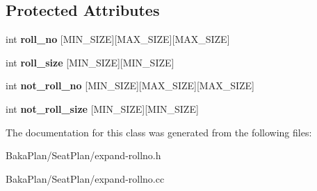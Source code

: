 \subsection*{Protected Attributes}
\begin{DoxyCompactItemize}
\item 
\hypertarget{classExapandRollNo_ae27a8647cfc7f93a5ba2fbfef8afa5c8}{int {\bfseries roll\-\_\-no} \mbox{[}M\-I\-N\-\_\-\-S\-I\-Z\-E\mbox{]}\mbox{[}M\-A\-X\-\_\-\-S\-I\-Z\-E\mbox{]}\mbox{[}M\-A\-X\-\_\-\-S\-I\-Z\-E\mbox{]}}\label{classExapandRollNo_ae27a8647cfc7f93a5ba2fbfef8afa5c8}

\item 
\hypertarget{classExapandRollNo_a892479a25a021a95e9c4b38ed30208a5}{int {\bfseries roll\-\_\-size} \mbox{[}M\-I\-N\-\_\-\-S\-I\-Z\-E\mbox{]}\mbox{[}M\-I\-N\-\_\-\-S\-I\-Z\-E\mbox{]}}\label{classExapandRollNo_a892479a25a021a95e9c4b38ed30208a5}

\item 
\hypertarget{classExapandRollNo_ac3526c93e25b52ab118f66150c980dbd}{int {\bfseries not\-\_\-roll\-\_\-no} \mbox{[}M\-I\-N\-\_\-\-S\-I\-Z\-E\mbox{]}\mbox{[}M\-A\-X\-\_\-\-S\-I\-Z\-E\mbox{]}\mbox{[}M\-A\-X\-\_\-\-S\-I\-Z\-E\mbox{]}}\label{classExapandRollNo_ac3526c93e25b52ab118f66150c980dbd}

\item 
\hypertarget{classExapandRollNo_a809856dbd610c81509f2fdf2cc11e57f}{int {\bfseries not\-\_\-roll\-\_\-size} \mbox{[}M\-I\-N\-\_\-\-S\-I\-Z\-E\mbox{]}\mbox{[}M\-I\-N\-\_\-\-S\-I\-Z\-E\mbox{]}}\label{classExapandRollNo_a809856dbd610c81509f2fdf2cc11e57f}

\end{DoxyCompactItemize}


The documentation for this class was generated from the following files\-:\begin{DoxyCompactItemize}
\item 
Baka\-Plan/\-Seat\-Plan/expand-\/rollno.\-h\item 
Baka\-Plan/\-Seat\-Plan/expand-\/rollno.\-cc\end{DoxyCompactItemize}

